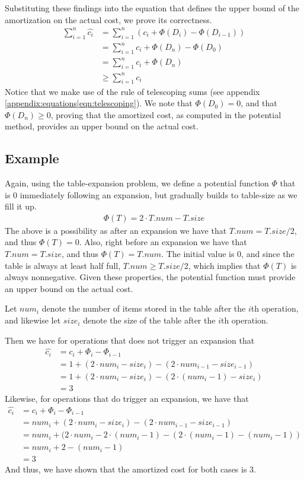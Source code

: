 Substituting these findings into the equation that defines the upper bound of
the amortization on the actual cost, we prove its correctness.
\begin{align}
	\sum_{i=1}^{n}{\hat{c_i}}
	&= \sum_{i=1}^{n}{(c_i + \Phi(D_i) - \Phi(D_{i-1}))} \\
	&= \sum_{i=1}^{n}{c_i + \Phi(D_n) - \Phi(D_{0})} \\
	&= \sum_{i=1}^{n}{c_i + \Phi(D_n)} \\
	&\geq \sum_{i=1}^{n}{c_i}
\end{align}
Notice that we make use of the rule of telescoping sums (see appendix
\ref{appendix:equations|eqn:telescoping}). We note that $\Phi(D_0) = 0$,
and that $\Phi(D_n) \geq 0$, proving that the amortized cost, as computed in
the potential method, provides an upper bound on the actual cost.

\newpage
\subsection{Example}
Again, using the table-expansion problem, we define a potential function
$\Phi$ that is 0 immediately following an expansion, but gradually builds to
table-size as we fill it up.
\begin{align}
	\Phi(T) = 2 \cdot T.num - T.size
\end{align}
The above is a possibility as after an expansion we have that $T.num =
T.size/2$, and thus $\Phi(T) = 0$. Also, right before an expansion we have
that $T.num = T.size$, and thus $\Phi(T) = T.num$. The initial value is 0,
and since the table is always at least half full, $T.num \geq T.size/2$,
which implies that $\Phi(T)$ is always nonnegative. Given these properties,
the potential function must provide an upper bound on the actual cost.

Let $num_i$ denote the number of items stored in the table after the $i$th
operation, and likewise let $size_i$ denote the size of the table after the
$i$th operation.

Then we have for operations that does not trigger an expansion that
\begin{align}
	\hat{c_i} &= c_i + \Phi_i - \Phi_{i-1} \\
	&= 1 + (2 \cdot num_i - size_i) - (2 \cdot num_{i-1} - size_{i-1}) \\
	&= 1 + (2 \cdot num_i - size_i) - (2 \cdot (num_{i}-1) - size_{i}) \\
	&= 3
\end{align}
Likewise, for operations that do trigger an expansion, we have that
\begin{align}
	\hat{c_i} &= c_i + \Phi_i - \Phi_{i-1} \\
	&= num_i + (2 \cdot num_i - size_i) - (2 \cdot num_{i-1} - size_{i-1}) \\
	&= num_i + (2 \cdot num_i - 2 \cdot (num_i - 1)
	- (2 \cdot (num_{i} - 1) - (num_i - 1)) \\
	&= num_i + 2 - (num_i - 1) \\
	&= 3
\end{align}
And thus, we have shown that the amortized cost for both cases is 3.

